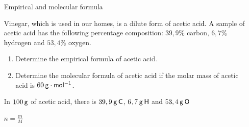     \noindent
\label{m38712*secfhsst!!!underscore!!!id1308}\vspace{.5cm} 
      \noindent 
      \begin{wex}{Empirical and molecular formula
      }
 {
     \label{m38712*probfhsst!!!underscore!!!id1310}
      \label{m38712*id281533}Vinegar, which is used in our homes, is a dilute form of acetic acid. A sample of acetic acid has the following percentage composition: $39,9\%$ carbon, $6,7\%$ hydrogen and $53,4\%$ oxygen.\par 
      \label{m38712*id281540}\begin{enumerate}[noitemsep, label=\textbf{\arabic*}. ] 
            \leftskip=20pt\rightskip=\leftskip\label{m38712*uid71}\item Determine the empirical formula of acetic acid.
\label{m38712*uid72}\item Determine the molecular formula of acetic acid if the molar mass of acetic acid is $60\phantom{\rule{2pt}{0ex}}\mathsf{g}\ensuremath{\cdot}\mathsf{mol}{}^{-1}$.
\end{enumerate}
      \vspace{5pt}}
{
      \label{m38712*id281607}In $100\phantom{\rule{2pt}{0ex}}\mathsf{g}$ of acetic acid, there is $39,9\phantom{\rule{2pt}{0ex}}\mathsf{g}\phantom{\rule{2pt}{0ex}}\mathsf{C}$, $6,7\phantom{\rule{2pt}{0ex}}\mathsf{g}\phantom{\rule{2pt}{0ex}}\mathsf{H}$ and $53,4\phantom{\rule{2pt}{0ex}}\mathsf{g}\phantom{\rule{2pt}{0ex}}\mathsf{O}$\par 
      \pagebreak
      \label{m38712*id281633}
        $n=\frac{m}{M}$
      \par 
      \label{m38712*id281653}\nopagebreak\noindent{}
        
}
\end{wex}

